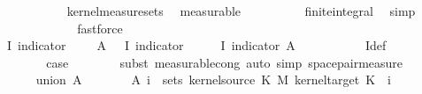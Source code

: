 \begin{isabellebody}
\ \ \ \ \ \ \ \ \isamarkupfalse%
\ {\isasymomega}\ kernel{\isacharunderscore}{\kern0pt}measure{\isacharunderscore}{\kern0pt}sets\ \isamarkupfalse%
\ measurable\isanewline
\ \ \ \ \ \ \ \ \isamarkupfalse%
\ finite{\isacharunderscore}{\kern0pt}integral\ \isamarkupfalse%
\ simp\isanewline
\ \ \ \ \ \ \ \ \isamarkupfalse%
\ {\isasymomega}\ \isamarkupfalse%
\ fastforce\isanewline
\ \ \ \ \ \ \isamarkupfalse%
\ \isamarkupfalse%
\ {\isachardoublequoteopen}I\ {\isacharparenleft}{\kern0pt}indicator\ {\isacharparenleft}{\kern0pt}{\isacharparenleft}{\kern0pt}{\isacharquery}{\kern0pt}{\isasymOmega}\ {\isasymtimes}\ {\isacharquery}{\kern0pt}{\isasymOmega}\ {\isacharminus}{\kern0pt}\ A{\isacharparenright}{\kern0pt}{\isacharparenright}{\kern0pt}\ {\isasymomega}\ {\isacharequal}{\kern0pt}\ I\ {\isacharparenleft}{\kern0pt}indicator\ {\isacharparenleft}{\kern0pt}{\isacharquery}{\kern0pt}{\isasymOmega}\ {\isasymtimes}\ {\isacharquery}{\kern0pt}{\isasymOmega}\ {\isasymomega}\ {\isacharminus}{\kern0pt}\ I\ {\isacharparenleft}{\kern0pt}indicator\ A{\isacharparenright}{\kern0pt}\ {\isasymomega}\isanewline
\ \ \ \ \ \ \ \ \isamarkupfalse%
\ I{\isacharunderscore}{\kern0pt}def\ \isacommand{{\isachardot}{\kern0pt}}\isamarkupfalse%
\isanewline
\ \ \ \ \isamarkupfalse%
\isanewline
\ \ \ \ \isamarkupfalse%
\ \isamarkupfalse%
\ {\isacharquery}{\kern0pt}case\isanewline
\ \ \ \ \ \ \isamarkupfalse%
\ {\isacharparenleft}{\kern0pt}subst\ measurable{\isacharunderscore}{\kern0pt}cong{\isacharcomma}{\kern0pt}\ auto\ simp{\isacharcolon}{\kern0pt}\ space{\isacharunderscore}{\kern0pt}pair{\isacharunderscore}{\kern0pt}measure{\isacharparenright}{\kern0pt}\isanewline
\ \ \isamarkupfalse%
\isanewline
\ \ \ \ \isamarkupfalse%
\ {\isacharparenleft}{\kern0pt}union\ A{\isacharparenright}{\kern0pt}\isanewline
\ \ \ \ \isamarkupfalse%
\ \isamarkupfalse%
\ {\isachardoublequoteopen}A\ i\ {\isasymin}\ sets\ {\isacharparenleft}{\kern0pt}kernel{\isacharunderscore}{\kern0pt}source\ K\ {\isasymOtimes}\isactrlsub M\ kernel{\isacharunderscore}{\kern0pt}target\ K{\isacharparenright}{\kern0pt}{\isachardoublequoteclose}\ \ i\isanewline

\end{isabellebody}
